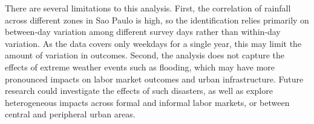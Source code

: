 There are several limitations to this analysis. First, the correlation of rainfall across different zones in Sao Paulo is high, so the identification relies primarily on between-day variation among different survey days rather than within-day variation. As the data covers only weekdays for a single year, this may limit the amount of variation in outcomes. Second, the analysis does not capture the effects of extreme weather events such as flooding, which may have more pronounced impacts on labor market outcomes and urban infrastructure. Future research could investigate the effects of such disasters, as well as explore heterogeneous impacts across formal and informal labor markets, or between central and peripheral urban areas.

